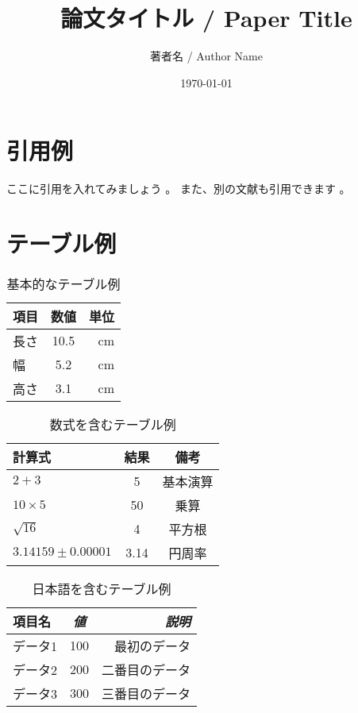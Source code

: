 \documentclass[a4paper,11pt]{article}
\begin{document}
\title{論文タイトル / Paper Title}
\author{著者名 / Author Name}
\date{\today}
\maketitle

\tableofcontents
\clearpage



\section{引用例}
ここに引用を入れてみましょう \cite{example2024}。
また、別の文献も引用できます \cite{examplebook2024}。

\section{テーブル例}

\begin{table}[h]
\centering
\caption{基本的なテーブル例}
\begin{tabular}{|l|c|r|}
\hline
項目 & 数値 & 単位 \\
\hline
長さ & 10.5 & cm \\
幅 & 5.2 & cm \\
高さ & 3.1 & cm \\
\hline
\end{tabular}
\end{table}

\begin{table}[h]
\centering
\caption{数式を含むテーブル例}
\begin{tabular}{|l|c|c|}
\hline
計算式 & 結果 & 備考 \\
\hline
$2 + 3$ & 5 & 基本演算 \\
$10 \times 5$ & 50 & 乗算 \\
$\sqrt{16}$ & 4 & 平方根 \\
$3.14159 \pm 0.00001$ & 3.14 & 円周率 \\
\hline
\end{tabular}
\end{table}

\begin{table}[h]
\centering
\caption{日本語を含むテーブル例}
\begin{tabular}{|l|c|r|}
\hline
\textbf{項目名} & \textit{値} & \emph{説明} \\
\hline
データ1 & 100 & 最初のデータ \\
データ2 & 200 & 二番目のデータ \\
データ3 & 300 & 三番目のデータ \\
\hline
\end{tabular}
\end{table}




\end{document}
